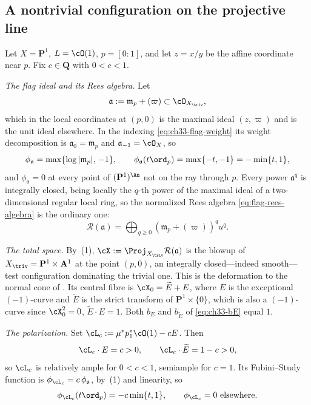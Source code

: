 \subsection{A nontrivial configuration on the projective line}
\label{sec:ch33-example-dnc}

\begin{example}
\label{ex:ch33-dnc-p1}
Let $X=\mathbf P^1$, $L=\cO(1)$, $p=[0:1]$, and let $z=x/y$ be the
affine coordinate near $p$.  Fix $c\in\mathbf Q$ with $0<c<1$.

\emph{The flag ideal and its Rees algebra.}  Let
\begin{equation}
\label{eq:ch33-dnc-flag}
 \mathfrak a:=\mathfrak m_p+(\varpi)\subset\cO_{X_{\triv}} ,
\end{equation}
which in the local coordinates at $(p,0)$ is the maximal ideal
$(z,\varpi)$ and is the unit ideal elsewhere.  In the indexing
\eqref{eq:ch33-flag-weight} its weight decomposition is
$\mathfrak a_0=\mathfrak m_p$ and $\mathfrak a_{-1}=\cO_X$, so
\begin{equation}
\label{eq:ch33-dnc-phi-a}
 \phi_{\mathfrak a}=\max\{\log|\mathfrak m_p|,\,-1\},
 \qquad
 \phi_{\mathfrak a}(t\ord_p)=\max\{-t,-1\}=-\min\{t,1\},
\end{equation}
and $\phi_{\mathfrak a}=0$ at every point of
$(\mathbf P^1)^{\An}$ not on the ray through $p$.  Every power
$\mathfrak a^q$ is integrally closed, being locally the $q$-th power of
the maximal ideal of a two-dimensional regular local ring, so the normalized
Rees algebra \eqref{eq:flag-rees-algebra} is the ordinary one:
\begin{equation}
\label{eq:ch33-dnc-rees}
 \mathcal R(\mathfrak a)=\bigoplus_{q\geq0}(\mathfrak m_p+(\varpi))^q u^q .
\end{equation}

\emph{The total space.}  By
\,(1), $\cX:=\Proj_{X_{\triv}}\mathcal
R(\mathfrak a)$ is the blowup of $X_{\triv}=\mathbf P^1\times\mathbf A^1$
at the point $(p,0)$, an integrally closed---indeed smooth---test
configuration dominating the trivial one.  This is the deformation to the
normal cone of .  Its central
fibre is $\cX_0=\widetilde E+E$, where $E$ is the exceptional
$(-1)$-curve and $\widetilde E$ is the strict transform of
$\mathbf P^1\times\{0\}$, which is also a $(-1)$-curve since
$\cX_0^2=0$, $\widetilde E\cdot E=1$.  Both $b_{E}$ and
$b_{\widetilde E}$ of \eqref{eq:ch33-bE} equal $1$.

\emph{The polarization.}  Set
$\cL_c:=\mu^\ast p_1^\ast\cO(1)-cE$.  Then
\[
 \cL_c\cdot E=c>0,
 \qquad
 \cL_c\cdot\widetilde E=1-c>0 ,
\]
so $\cL_c$ is relatively ample for $0<c<1$, semiample for $c=1$.  Its
Fubini--Study function is $\phi_{\cL_c}=c\,\phi_{\mathfrak a}$, by
\,(1) and linearity, so
\begin{equation}
\label{eq:ch33-dnc-phi}
 \phi_{\cL_c}(t\ord_p)=-c\min\{t,1\},
 \qquad
 \phi_{\cL_c}=0\ \text{elsewhere}.
\end{equation}


\end{example}
